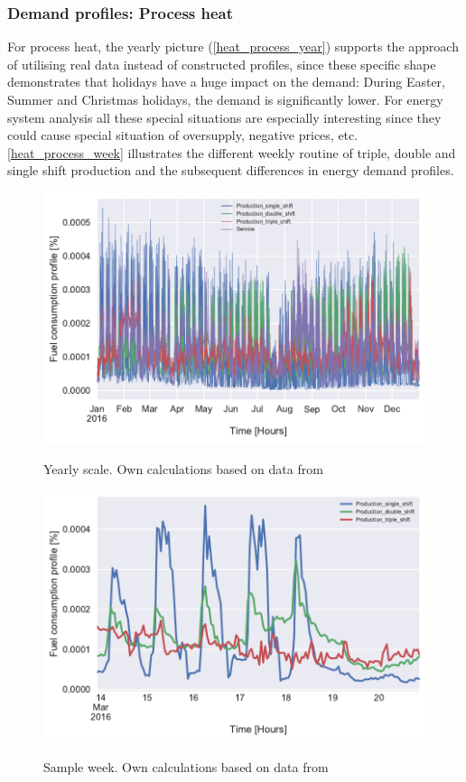 \documentclass[review]{elsarticle}
\begin{document}
\subsubsection{Demand profiles: Process heat}
For process heat, the yearly picture (\autoref{heat_process_year}) supports the approach of utilising real data instead of constructed profiles, since these specific shape demonstrates that holidays have a huge impact on the demand: During Easter, Summer and Christmas holidays, the demand is significantly lower. For energy system analysis all these special situations are especially interesting since they could cause special situation of oversupply, negative prices, etc. \autoref{heat_process_week} illustrates the different weekly routine of triple, double and single shift production and the subsequent differences in energy demand profiles. 

\begin{figure}[H]
\centering
\includegraphics[width=\linewidth]{Img/profiles/heatprofile_process_year_perc.pdf}\\
\caption{Yearly scale. Own calculations based on data from \cite{DanskGasDistribution2016,VM2015}}
\label{heat_process_year}
\end{figure}
	
\begin{figure}[H]
\centering
\includegraphics[width=\linewidth]{Img/profiles/heatprofile_process_week_perc_noserv.pdf}\\
\caption{Sample week. Own calculations based on data from \cite{DanskGasDistribution2016,VM2015}}
\label{heat_process_week}
\end{figure}
\end{document}
